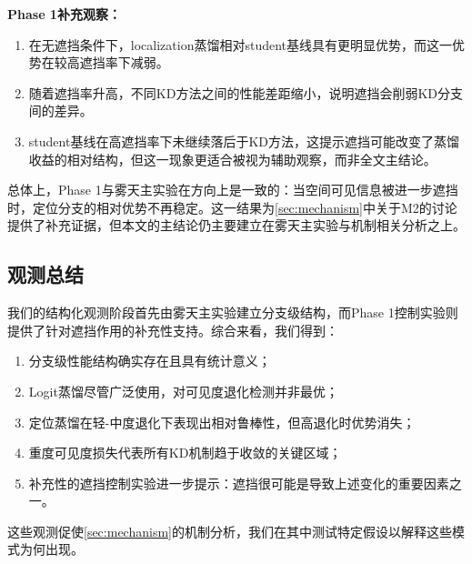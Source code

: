 \textbf{Phase 1补充观察：}
\begin{enumerate}
    \item 在无遮挡条件下，localization蒸馏相对student基线具有更明显优势，而这一优势在较高遮挡率下减弱。
    \item 随着遮挡率升高，不同KD方法之间的性能差距缩小，说明遮挡会削弱KD分支间的差异。
    \item student基线在高遮挡率下未继续落后于KD方法，这提示遮挡可能改变了蒸馏收益的相对结构，但这一现象更适合被视为辅助观察，而非全文主结论。
\end{enumerate}

总体上，Phase 1与雾天主实验在方向上是一致的：当空间可见信息被进一步遮挡时，定位分支的相对优势不再稳定。这一结果为\cref{sec:mechanism}中关于M2的讨论提供了补充证据，但本文的主结论仍主要建立在雾天主实验与机制相关分析之上。

\subsection{观测总结}

我们的结构化观测阶段首先由雾天主实验建立分支级结构，而Phase 1控制实验则提供了针对遮挡作用的补充性支持。综合来看，我们得到：
\begin{enumerate}
    \item 分支级性能结构确实存在且具有统计意义；
    \item Logit蒸馏尽管广泛使用，对可见度退化检测并非最优；
    \item 定位蒸馏在轻-中度退化下表现出相对鲁棒性，但高退化时优势消失；
    \item 重度可见度损失代表所有KD机制趋于收敛的关键区域；
    \item 补充性的遮挡控制实验进一步提示：遮挡很可能是导致上述变化的重要因素之一。
\end{enumerate}

这些观测促使\cref{sec:mechanism}的机制分析，我们在其中测试特定假设以解释这些模式为何出现。
